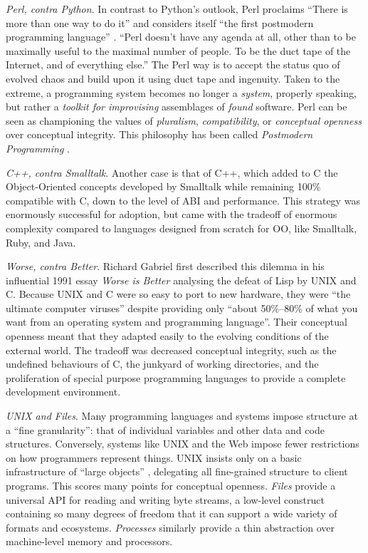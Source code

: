 \documentclass[ twoside,openright,titlepage,numbers=noenddot,headinclude,footinclude,cleardoublepage=empty,abstract=on,
                BCOR=5mm,paper=a4,fontsize=11pt
                ]{scrreprt}
\newcommand{\tp}[1]{}
\theoremstyle{definition}
\begin{document}
\emph{Perl, contra Python}. In contrast to Python's outlook, Perl
proclaims ``There is more than one way to do it'' and considers itself
``the first postmodern programming language'' \parencite{Perl}. ``Perl
doesn't have any agenda at all, other than to be maximally useful to the
maximal number of people. To be the duct tape of the Internet, and of
everything else.'' The Perl way is to accept the status quo of evolved
chaos and build upon it using duct tape and ingenuity. Taken to the
extreme, a programming system becomes no longer a \emph{system},
properly speaking, but rather a \emph{toolkit for improvising}
assemblages of \emph{found} software. Perl can be seen as championing
the values of \emph{pluralism}, \emph{compatibility}, or
\emph{conceptual openness} over conceptual integrity. This philosophy
has been called \emph{Postmodern Programming} \parencite{PoMoProNotes}.

\emph{C++, contra Smalltalk}. Another case is that of C++, which added
to C the Object-Oriented concepts developed by Smalltalk while remaining
100\% compatible with C, down to the level of ABI and performance. This
strategy was enormously successful for adoption, but came with the
tradeoff of enormous complexity compared to languages designed from
scratch for OO, like Smalltalk, Ruby, and Java.

\emph{Worse, contra Better}. Richard Gabriel first described this
dilemma in his influential 1991 essay \emph{Worse is Better}
\parencite{WIB} analysing the defeat of Lisp by UNIX and C. Because UNIX
and C were so easy to port to new hardware, they were ``the ultimate
computer viruses'' despite providing only ``about 50\%--80\% of what you
want from an operating system and programming language''. Their
conceptual openness meant that they adapted easily to the evolving
conditions of the external world. The tradeoff was decreased conceptual
integrity, such as the undefined behaviours of C, the junkyard of
working directories, and the proliferation of special purpose
programming languages to provide a complete development environment.

\tp{Smalltalk objects are "all levels of granularity"; UNIX files are large-scale; Haskell data structures small-scale; very big virtual machines; there is also the web / distributed file system?}

\emph{UNIX and Files}. Many programming languages and systems impose
structure at a ``fine granularity'': that of individual variables and
other data and code structures. Conversely, systems like UNIX and the
Web impose fewer restrictions on how programmers represent things. UNIX
insists only on a basic infrastructure of ``large objects''
\parencite{KellOS}, delegating all fine-grained structure to client
programs. This scores many points for conceptual openness. \emph{Files}
provide a universal API for reading and writing byte streams, a
low-level construct containing so many degrees of freedom that it can
support a wide variety of formats and ecosystems. \emph{Processes}
similarly provide a thin abstraction over machine-level memory and
processors.
\end{document}
